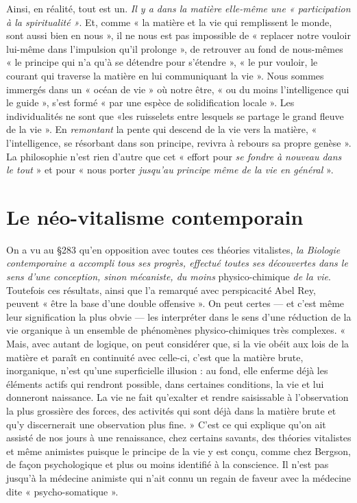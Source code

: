 Ainsi, en réalité, tout est un. {\it Il y a dans la matière elle-même une
« participation à la spiritualité »}. Et, comme « la matière et la vie qui
remplissent le monde, sont aussi bien en nous », il ne nous est pas
impossible de « replacer notre vouloir lui-même dans l'impulsion qu'il
prolonge », de retrouver au fond de nous-mêmes « le principe qui n’a
qu'à se détendre pour s'étendre », « le pur vouloir, le courant qui
traverse la matière en lui communiquant la vie ». Nous sommes
immergés dans un « océan de vie » où notre être, « ou du moins
l'intelligence qui le guide », s’est formé « par une espèce de solidification
locale ». Les individualités ne sont que «les ruisselets entre
lesquels se partage le grand fleuve de la vie ». En {\it remontant} la pente
qui descend de la vie vers la matière, « l'intelligence, se résorbant
dans son principe, revivra à rebours sa propre genèse ». La philosophie
n’est rien d’autre que cet « effort pour {\it se fondre à nouveau dans
le tout} » et pour « nous porter {\it jusqu'au principe même de la vie en
général} ».

\section{Le néo-vitalisme contemporain}%
On a vu au \S283
qu’en opposition avec toutes ces théories vitalistes, {\it la Biologie
contemporaine a accompli tous ses progrès, effectué toutes ses découvertes
dans le sens d’une conception, sinon mécaniste, du moins} physico-chimique
{\it de la vie}. Toutefois ces résultats, ainsi que l’a remarqué
avec perspicacité Abel Rey, peuvent « être la base d’une double
offensive ». On peut certes — et c’est même leur signification la plus
obvie — les interpréter dans le sens d’une réduction de la vie organique
à un ensemble de phénomènes physico-chimiques très complexes.
« Mais, avec autant de logique, on peut considérer que, si la vie obéit
aux lois de la matière et paraît en continuité avec celle-ci, c’est que
la matière brute, inorganique, n’est qu'une superficielle illusion :
au fond, elle enferme déjà les éléments actifs qui rendront possible,
dans certaines conditions, la vie et lui donneront naissance. La vie
ne fait qu’exalter et rendre saisissable à l'observation la plus grossière
des forces, des activités qui sont déjà dans la matière brute et qu'y
discernerait une observation plus fine. » C’est ce qui explique qu’on
ait assisté de nos jours à une renaissance, chez certains savants, des
théories vitalistes et même animistes puisque le principe de la vie
y est conçu, comme chez Bergson, de façon psychologique et plus ou
moins identifié à la conscience. Il n’est pas jusqu’à la médecine animiste
qui n'ait connu un regain de faveur avec la médecine dite
« psycho-somatique ».

